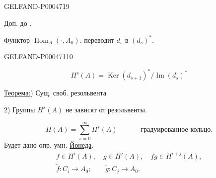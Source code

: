\begin{GelfandAdjacentEvidence}{GELFAND-P000471}{9}


Доп. до .

Функтор $\operatorname{Hom}_A(\cdot,A_0)$. переводит $d_s$ в $(d_s)^*$.
\end{GelfandAdjacentEvidence}
\begin{GelfandAdjacentEvidence}{GELFAND-P000471}{10}

\[
H^s(A)=\operatorname{Ker}(d_{s+1})^*/\operatorname{Im}(d_s)^*
\]
\end{GelfandAdjacentEvidence}


\uline{Теорема:}) Сущ. своб. резольвента

\hspace*{6em}2) Группы $H^s(A)$ не зависят от резольвенты.

\[
H(A)=\sum_{s=0}^{\infty}H^s(A)\qquad\text{— градуированное кольцо.}
\]
Будет дано опр. умн. \uline{Йонеда}.
\[
\begin{gathered}
f\in H^i(A),\quad g\in H^j(A),\quad fg\in H^{i+j}(A),\\
\widetilde f\colon C_i\longrightarrow A_0;\qquad
\widetilde g\colon C_j\longrightarrow A_0.
\end{gathered}
\]


